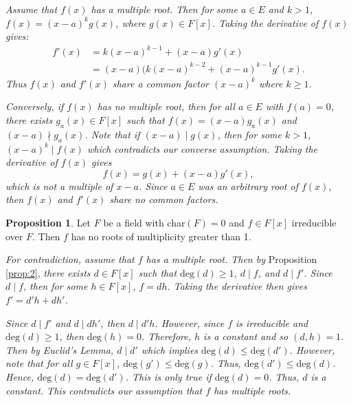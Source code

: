 \documentclass{article}
\makeatletter
\theoremstyle{definition}
\newtheorem{prop}{Proposition}
\theoremstyle{remark}
\let\oldproofname=\proofname
\renewcommand{\proofname}{\bf{\textit{\oldproofname}}}
\theoremstyle{definition}
\renewenvironment{proof}[1][\proofname]{\par
  \pushQED{\qed}%
  \normalfont \topsep6\p@\@plus6\p@\relax
  \list{}{\leftmargin=0mm
          \rightmargin=0mm
          \settowidth{\itemindent}{\itshape#1}%
          \labelwidth=4mm
          \parsep=0pt \listparindent=0mm%
  }
  \item[\hskip\labelsep
        \itshape
    #1\@addpunct{.}]\ignorespaces
}{%
  \popQED\endlist\@endpefalse
}
\makeatother
\begin{document}
        \begin{proof}
            \emph{Assume that $f(x)$ has a multiple root. Then for some $a\in E$ and $k>1$, $f(x)=(x-a)^kg(x)$, where $g(x)\in F[x]$. Taking the derivative of $f(x)$ gives:
                \begin{equation*}
                    \begin{split}
                        f'(x)&=k(x-a)^{k-1}+(x-a)g'(x) \\
                        &= (x-a)(k(x-a)^{k-2}+(x-a)^{k-1}g'(x).
                    \end{split}
                \end{equation*}
                Thus $f(x)$ and $f'(x)$ share a common factor $(x-a)^k$ where $k\geq 1$.}\par\hspace{4mm}
            \emph{Conversely, if $f(x)$ has no multiple root, then for all $a\in E$ with $f(a)=0$, there exists $g_a(x)\in F[x]$ such that $f(x)=(x-a)g_a(x)$ and $(x-a)\nmid g_a(x)$. Note that if $(x-a)\mid g(x)$, then for some $k>1$, $(x-a)^k\mid f(x)$ which contradicts our converse assumption. Taking the derivative of $f(x)$ gives
                \begin{equation*}
                    f(x)=g(x)+(x-a)g'(x),
                \end{equation*}
            which is not a multiple of $x-a$. Since $a\in E$ was an arbitrary root of $f(x)$, then $f(x)$ and $f'(x)$ share no common factors.
                }
        \end{proof}
    \begin{prop}\label{prop:4}
        Let $F$ be a field with char$(F)=0$ and $f\in F[x]$ irreducible over $F$. Then $f$ has no roots of multiplicity greater than 1.
    \end{prop}
        \begin{proof}
            \emph{For contradiction, assume that $f$ has a multiple root. Then by} Proposition \ref{prop:2}, \emph{there exists $d\in F[x]$ such that $\text{deg}(d)\geq 1$, $d\mid f$, and $d\mid f'$. Since $d\mid f$, then for some $h\in F[x]$, $f=dh$. Taking the derivative then gives $f'=d'h+dh'$.}\par\hspace{4mm}
            \emph{Since $d\mid f'$ and $d\mid dh'$, then $d\mid d'h$. However, since $f$ is irreducible and $\text{deg}(d)\geq 1$, then $\text{deg}(h)=0$. Therefore, $h$ is a constant and so $(d,h)=1$. Then by Euclid's Lemma, $d\mid d'$ which implies $\text{deg}(d)\leq\text{deg}(d')$. However, note that for all $g\in F[x]$, $\text{deg}(g')\leq\text{deg}(g)$. Thus, $\text{deg}(d')\leq\text{deg}(d)$. Hence, $\text{deg}(d)=\text{deg}(d')$. This is only true if $\text{deg}(d)=0$. Thus, $d$ is a constant. This contradicts our assumption that $f$ has multiple roots.}
        \end{proof}
\end{document}
